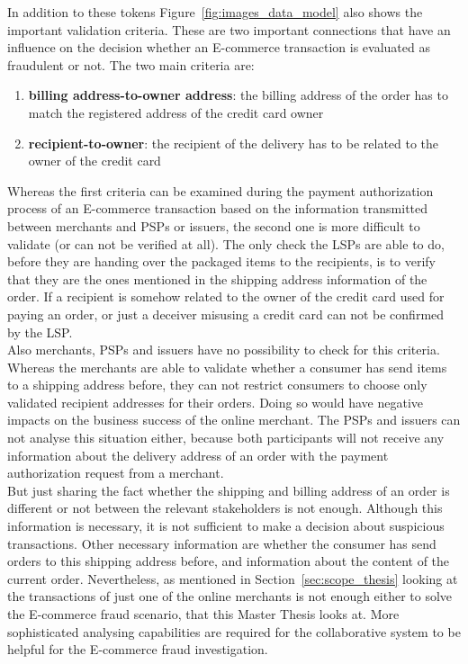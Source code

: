 In addition to these tokens Figure~\ref{fig:images_data_model} also shows the important validation criteria. These are two important connections that have an influence on the decision whether an \gls{E-commerce} transaction is evaluated as fraudulent or not. The two main criteria are: \@

\begin{enumerate}
  \item \textbf{billing address-to-owner address}: the billing address of the order has to match the registered address of the credit card owner
  \item \textbf{recipient-to-owner}: the recipient of the delivery has to be related to the owner of the credit card
\end{enumerate}

Whereas the first criteria can be examined during the payment authorization process of an \gls{E-commerce} transaction based on the information transmitted between merchants and \gls{PSP}s or issuers, the second one is more difficult to validate (or can not be verified at all). The only check the \gls{LSP}s are able to do, before they are handing over the packaged items to the recipients, is to verify that they are the ones mentioned in the shipping address information of the order. If a recipient is somehow related to the owner of the credit card used for paying an order, or just a deceiver misusing a credit card can not be confirmed by the \gls{LSP}. \\

Also merchants, \gls{PSP}s and issuers have no possibility to check for this criteria. Whereas the merchants are able to validate whether a consumer has send items to a shipping address before, they can not restrict consumers to choose only validated recipient addresses for their orders. Doing so would have negative impacts on the business success of the online merchant. The \gls{PSP}s and issuers can not analyse this situation either, because both participants will not receive any information about the delivery address of an order with the payment authorization request from a merchant. \\

But just sharing the fact whether the shipping and billing address of an order is different or not between the relevant stakeholders is not enough. Although this information is necessary, it is not sufficient to make a decision about suspicious transactions. Other necessary information are whether the consumer has send orders to this shipping address before, and information about the content of the current order. Nevertheless, as mentioned in Section~\ref{sec:scope_thesis} looking at the transactions of just one of the online merchants is not enough either to solve the \gls{E-commerce} fraud scenario, that this Master Thesis looks at. More sophisticated analysing capabilities are required for the collaborative system to be helpful for the \gls{E-commerce} fraud investigation.

